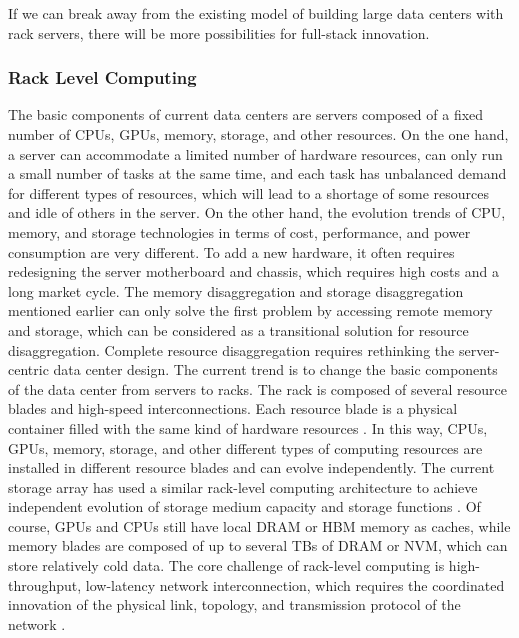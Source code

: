 If we can break away from the existing model of building large data centers with rack servers, there will be more possibilities for full-stack innovation.

\subsubsection{Rack Level Computing}

The basic components of current data centers are servers composed of a fixed number of CPUs, GPUs, memory, storage, and other resources. On the one hand, a server can accommodate a limited number of hardware resources, can only run a small number of tasks at the same time, and each task has unbalanced demand for different types of resources, which will lead to a shortage of some resources and idle of others in the server. On the other hand, the evolution trends of CPU, memory, and storage technologies in terms of cost, performance, and power consumption are very different. To add a new hardware, it often requires redesigning the server motherboard and chassis, which requires high costs and a long market cycle. The memory disaggregation and storage disaggregation mentioned earlier can only solve the first problem by accessing remote memory and storage, which can be considered as a transitional solution for resource disaggregation. Complete resource disaggregation requires rethinking the server-centric data center design. The current trend is to change the basic components of the data center from servers to racks. The rack is composed of several resource blades and high-speed interconnections. Each resource blade is a physical container filled with the same kind of hardware resources \cite{camcubeos}. In this way, CPUs, GPUs, memory, storage, and other different types of computing resources are installed in different resource blades and can evolve independently. The current storage array has used a similar rack-level computing architecture to achieve independent evolution of storage medium capacity and storage functions \cite{pelican}. Of course, GPUs and CPUs still have local DRAM or HBM memory as caches, while memory blades are composed of up to several TBs of DRAM or NVM, which can store relatively cold data. The core challenge of rack-level computing is high-throughput, low-latency network interconnection, which requires the coordinated innovation of the physical link, topology, and transmission protocol of the network \cite{r2c2}.

